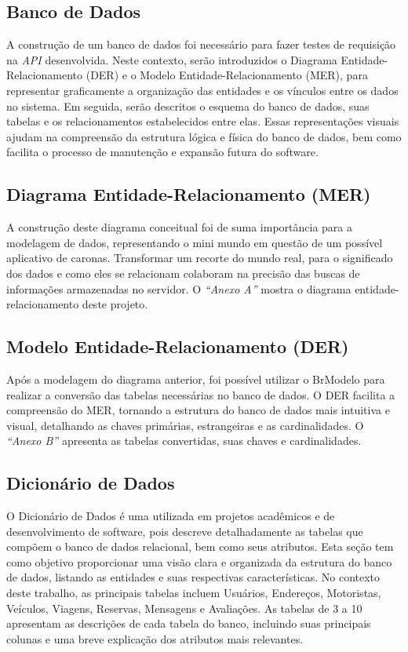 \clearpage

\subsection{Banco de Dados}

A construção de um banco de dados foi necessário para fazer testes de requisição na \textit{API} desenvolvida. Neste contexto, serão introduzidos o Diagrama Entidade-Relacionamento (DER) e o Modelo Entidade-Relacionamento (MER), para representar graficamente a organização das entidades e os vínculos entre os dados no sistema. Em seguida, serão descritos o esquema do banco de dados, suas tabelas e os relacionamentos estabelecidos entre elas. Essas representações visuais ajudam na compreensão da estrutura lógica e física do banco de dados, bem como facilita o processo de manutenção e expansão futura do software.

\subsection{Diagrama Entidade-Relacionamento (MER)}

A construção deste diagrama conceitual foi de suma importância para a modelagem de dados, representando o mini mundo em questão de um possível aplicativo de caronas. Transformar um recorte do mundo real, para o significado dos dados e como eles se relacionam colaboram na precisão das buscas de informações armazenadas no servidor. O \textit{``Anexo A''} mostra o diagrama entidade-relacionamento deste projeto.


\subsection{Modelo Entidade-Relacionamento (DER)}

Após a modelagem do diagrama anterior, foi possível utilizar o BrModelo para realizar a conversão das tabelas necessárias no banco de dados. O DER facilita a compreensão do MER, tornando a estrutura do banco de dados mais intuitiva e visual, detalhando as chaves primárias, estrangeiras e as cardinalidades. O \textit{``Anexo B''} apresenta as tabelas convertidas, suas chaves e cardinalidades.

\subsection{Dicionário de Dados}

O Dicionário de Dados é uma utilizada em projetos acadêmicos e de desenvolvimento de software, pois descreve detalhadamente as tabelas que compõem o banco de dados relacional, bem como seus atributos. Esta seção tem como objetivo proporcionar uma visão clara e organizada da estrutura do banco de dados, listando as entidades e suas respectivas características. No contexto deste trabalho, as principais tabelas incluem Usuários, Endereços, Motoristas, Veículos, Viagens, Reservas, Mensagens e Avaliações. As tabelas de 3 a 10 apresentam as descrições de cada tabela do banco, incluindo suas principais colunas e uma breve explicação dos atributos mais relevantes.

